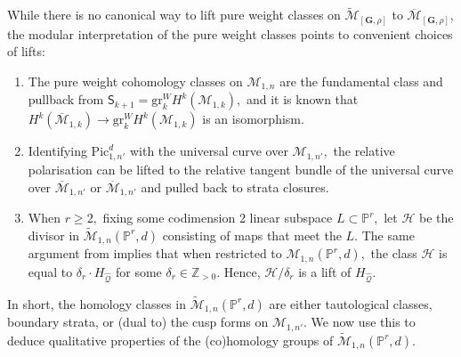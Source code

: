 \documentclass[12pt,reqno]{amsart}
\theoremstyle{definition}
\theoremstyle{definition}
\theoremstyle{definition}
\theoremstyle{definition}
\newcommand{\ol}[1]{\overline{#1}}
\newcommand{\PP}{\mathbb{P}}
\newcommand{\Mcal}{\mathcal{M}}
\newcommand{\Mbar}{\ol{\Mcal}}
\newcommand{\Mtil}{\widetilde{\mathcal{M}}}
\newcommand{\gr}{\mathrm{gr}}
\begin{document}
While there is no canonical way to lift pure weight classes on $\Mtil_{[\mathbf{G},\rho]}$ to $\Mbar_{[\mathbf{G},\rho]}$, the modular interpretation of the pure weight classes points to convenient choices of lifts:
\begin{enumerate}
  \item The pure weight cohomology classes on $\mathcal{M}_{1,n}$ are the fundamental class and pullback from $\mathsf{S}_{k+1}=\gr^W_{k} H^k(\mathcal{M}_{1,k}),$ and it is known that $H^k(\Mbar_{1,k})\to \gr^W_{k} H^k(\mathcal{M}_{1,k})$ is an isomorphism.
  \item Identifying $\mathrm{Pic}_{1,n'}^d$ with the universal curve over $\mathcal{M}_{1,n'},$ the relative polarisation can be lifted to the relative tangent bundle of the universal curve over $\Mbar_{1,n'}$ or $\Mbar_{1,n'}$ and pulled back to strata closures.
  \item When $r\geq 2,$ fixing some codimension 2 linear subspace $L\subset \mathbb{P}^r,$ let $\mathcal{H}$ be the divisor in $\Mtil_{1,n}(\PP^r,d)$ consisting of maps that meet the $L.$ The same argument from \cite[Lemma 1.1.1]{Pandharipande1999} implies that when restricted to $\mathcal{M}_{1,n}(\PP^r,d),$ the class $\mathcal{H}$ is equal to $\delta_r\cdot H_{\hat{\mathcal{Q}}}$ for some $\delta_r\in \mathbb{Z}_{>0}.$ Hence, $\mathcal{H}/\delta_r$ is a lift of $H_{\hat{\mathcal{Q}}}.$
\end{enumerate}

In short, the homology classes in $\Mtil_{1,n}(\PP^r,d)$ are either tautological classes, boundary strata, or (dual to) the cusp forms on $\mathcal{M}_{1,n'}.$ We now use this to deduce qualitative properties of the (co)homology groups of $\Mtil_{1,n}(\PP^r,d)$.
\end{document}
